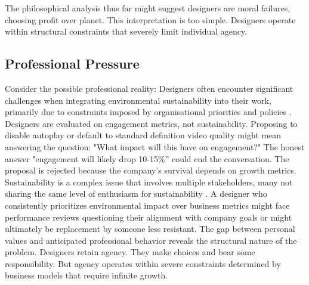 
The philosophical analysis thus far might suggest designers are moral failures, choosing profit over planet. This interpretation is too simple. Designers operate within structural constraints that severely limit individual agency.

\subsection{Professional Pressure}
Consider the possible professional reality: Designers often encounter significant challenges when integrating environmental sustainability into their work, primarily due to constraints imposed by organisational priorities and policies \cite{CALABRETTA2025145340}. Designers are evaluated on engagement metrics, not sustainability. Proposing to disable autoplay or default to standard definition video quality might mean answering the question: "What impact will this have on engagement?" The honest answer "engagement will likely drop 10-15\%” could end the conversation. The proposal is rejected because the company's survival depends on growth metrics. Sustainability is a complex issue that involves multiple stakeholders, many not sharing the same level of enthusiasm for sustainability \cite{CALABRETTA2025145340}. A designer who consistently prioritizes environmental impact over business metrics might face performance reviews questioning their alignment with company goals or might ultimately be replacement by someone less resistant. The gap between personal values and anticipated professional behavior reveals the structural nature of the problem. Designers retain agency. They make choices and bear some responsibility. But agency operates within severe constraints determined by business models that require infinite growth.

